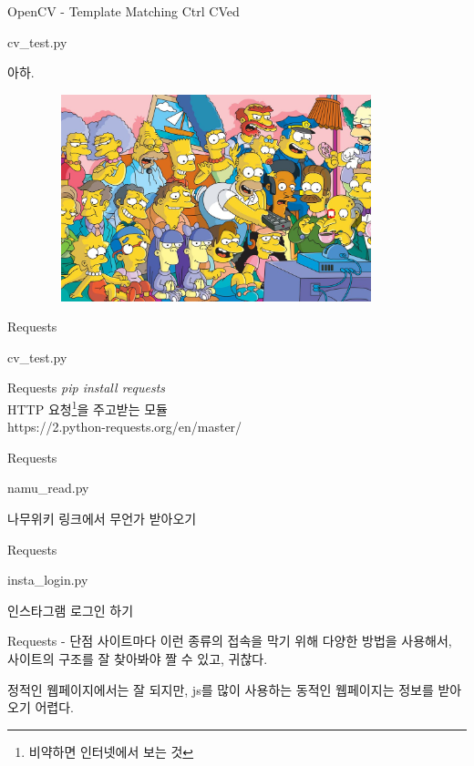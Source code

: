 \documentclass{beamer}
\begin{document}
\begin{frame}{OpenCV - Template Matching Ctrl CVed}
\begin{lstinputlisting}
  {cv_test.py}
\end{lstinputlisting}
\end{frame}

\begin{frame}{아하.}
\begin{figure}[H]
  \centering
  \includegraphics[width=100mm,height=60mm]{res.png}
\end{figure}
\end{frame}

\begin{frame}{Requests}
\begin{lstinputlisting}
  {cv_test.py}
\end{lstinputlisting}
\end{frame}

\begin{frame}{Requests}
\textit{pip install requests}\\
HTTP 요청\footnote{비약하면 인터넷에서 보는 것}을 주고받는 모듈\\
https://2.python-requests.org/en/master/
\end{frame}

\begin{frame}{Requests}
\begin{lstinputlisting}
  {namu_read.py}
\end{lstinputlisting}
나무위키 링크에서 무언가 받아오기
\end{frame}

\begin{frame}{Requests}
\begin{lstinputlisting}
  {insta_login.py}
\end{lstinputlisting}
인스타그램 로그인 하기
\end{frame}

\begin{frame}{Requests - 단점}
사이트마다 이런 종류의 접속을 막기 위해 다양한 방법을 사용해서,
사이트의 구조를 잘 찾아봐야 짤 수 있고, 귀찮다.

정적인 웹페이지에서는 잘 되지만, js를 많이 사용하는 동적인 웹페이지는 정보를
  받아오기 어렵다.
\end{frame}
\end{document}
